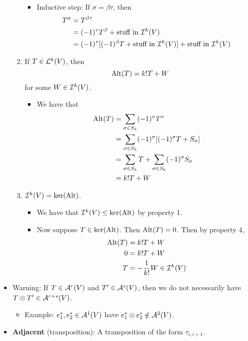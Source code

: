 \documentclass[../notes.tex]{subfiles}
\begin{document}
\begin{itemize}
\begin{enumerate}
\begin{itemize}
\begin{equation*}
\begin{split}
                \end{split}
            \end{equation*}
            \item Inductive step: If $\sigma=\beta\tau$, then
            \begin{align*}
                T^\sigma &= T^{\beta\tau}\\
                &= (-1)^\tau T^\beta+\text{stuff in }\ide[k]{V}\\
                &= (-1)^\tau[(-1)^\beta T+\text{stuff in }\ide[k]{V}]+\text{stuff in }\ide[k]{V}
            \end{align*}
        \end{itemize}
        \item If $T\in\lin[k]{V}$, then
        \begin{equation*}
            \Alt(T) = k!T+W
        \end{equation*}
        for some $W\in\ide[k]{V}$.
        \begin{itemize}
            \item We have that
            \begin{align*}
                \Alt(T) &= \sum_{\sigma\in S_k}(-1)^\sigma T^\sigma\\
                &= \sum_{\sigma\in S_k}(-1)^\sigma[(-1)^\sigma T+S_\sigma]\\
                &= \sum_{\sigma\in S_k}T+\sum_{\sigma\in S_k}(-1)^\sigma S_\sigma\\
                &= k!T+W
            \end{align*}
        \end{itemize}
        \item $\ide[k]{V}=\ker(\Alt)$.
        \begin{itemize}
            \item We have that $\ide[k]{V}\leq\ker(\Alt)$ by property 1.
            \item Now suppose $T\in\ker(\Alt)$. Then $\Alt(T)=0$. Then by property 4,
            \begin{align*}
                \Alt(T) &= k!T+W\\
                0 &= k!T+W\\
                T &= -\frac{1}{k!}W \in \ide[k]{V}
            \end{align*}
        \end{itemize}
    \end{enumerate}
    \item Warning: If $T\in\alt[r]{V}$ and $T'\in\alt[s]{V}$, then we do not necessarily have $T\otimes T'\in\alt[r+s]{V}$.
    \begin{itemize}
        \item Example: $e_1^*,e_2^*\in\alt[1]{V}$ have $e_1^*\otimes e_2^*\notin\alt[2]{V}$.
    \end{itemize}
    \item \textbf{Adjacent} (transposition): A transposition of the form $\tau_{i,i+1}$.
\end{itemize}
\end{document}
